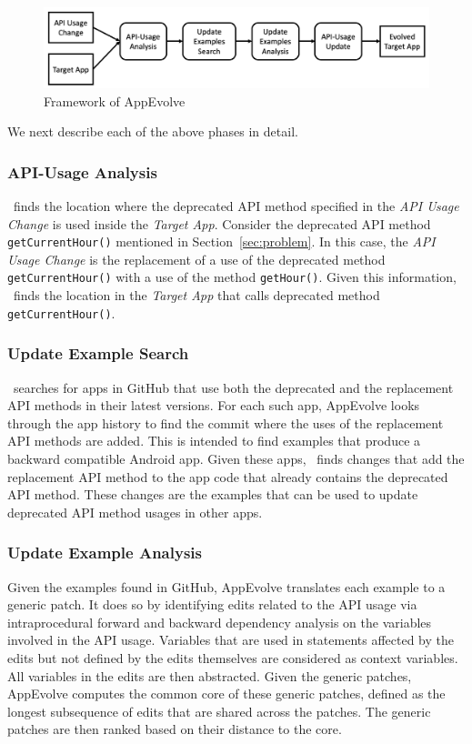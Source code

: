 \begin{figure}[t]
	\centering
	\includegraphics[width=0.8\linewidth]{framework.png}
	\caption{Framework of AppEvolve}
	\label{fig:framework}
\end{figure}

We next describe each of the above phases in detail.
\subsubsection{API-Usage Analysis}
\toolname\ finds the location where the deprecated API method specified in
the {\em API Usage Change} is used inside the {\em Target App}. Consider
the deprecated API method \texttt{getCurrentHour()} mentioned in
Section~\ref{sec:problem}.  In this case, the {\em API Usage Change} is the
replacement of a use of the deprecated method \texttt{getCurrentHour()}
with a use of the method \texttt{getHour()}. Given this information,
\toolname\ finds the location in the {\em Target App} that calls deprecated
method \texttt{getCurrentHour()}.

\subsubsection{Update Example Search}
\toolname\ searches for apps in GitHub that use both the deprecated and the
replacement API methods in their latest versions.  For each such app,
AppEvolve looks through the app history to find the commit where the uses
of the replacement API methods are added. This is intended to find examples
that produce a backward compatible Android app.  Given these apps, \toolname\ finds changes that add the
replacement API method to the app code that already contains the deprecated
API method. These changes are the examples that can be used to update
deprecated API method usages in other apps.

\subsubsection{Update Example Analysis}
Given the examples found in GitHub, AppEvolve translates each example to a
generic patch. It does so by identifying edits related to the API usage via
intraprocedural forward and backward dependency analysis on the variables
involved in the API usage. Variables that are used in statements affected
by the edits but not defined by the edits themselves are considered as
context variables. All variables in the edits are then abstracted. Given
the generic patches, AppEvolve computes the common core of these generic
patches, defined as the longest subsequence of edits that are shared across
the patches. The generic patches are then ranked based on their distance to
the core.

